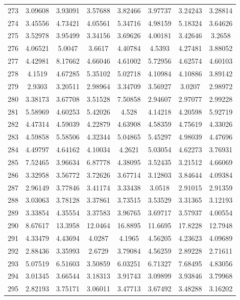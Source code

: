 \begin{figure}
\begin{tabular}{cccccccc}
273 & 3.09608 & 3.93091 & 3.57688 & 3.82466 & 3.97737 & 3.24243 & 3.28814\\
274 & 3.45556 & 4.73421 & 4.05561 & 5.34716 & 4.98159 & 5.18324 & 3.64626\\
275 & 3.52978 & 3.95499 & 3.34156 & 3.69626 & 4.00181 & 3.42646 & 3.2658\\
276 & 4.06521 & 5.0047 & 3.6617 & 4.40784 & 4.5393 & 4.27481 & 3.88052\\
277 & 4.42981 & 8.17662 & 4.66046 & 4.61002 & 5.72956 & 4.62574 & 4.60103\\
278 & 4.1519 & 4.67285 & 5.35102 & 5.02718 & 4.10984 & 4.10886 & 3.89142\\
279 & 2.9303 & 3.20511 & 2.98964 & 3.34709 & 3.56927 & 3.0207 & 2.98972\\
280 & 3.38173 & 3.67708 & 3.51528 & 7.50858 & 2.94607 & 2.97077 & 2.99228\\
281 & 5.58969 & 4.60253 & 5.42026 & 4.528 & 4.14218 & 4.20598 & 5.92719\\
282 & 4.47314 & 4.59039 & 4.22879 & 4.63908 & 4.58359 & 4.75619 & 4.33026\\
283 & 4.59858 & 5.58506 & 4.32344 & 5.04865 & 5.45297 & 4.98039 & 4.47696\\
284 & 4.49797 & 4.64162 & 4.10034 & 4.2621 & 5.03054 & 4.62273 & 3.76931\\
285 & 7.52465 & 3.96634 & 6.87778 & 4.38095 & 3.52435 & 3.21512 & 4.66069\\
286 & 3.32958 & 3.56772 & 3.72626 & 3.67714 & 3.12803 & 3.84644 & 4.09384\\
287 & 2.96149 & 3.77846 & 3.41174 & 3.33438 & 3.0518 & 2.91015 & 2.91359\\
288 & 3.03063 & 3.78128 & 3.37861 & 3.73515 & 3.53529 & 3.31365 & 3.12193\\
289 & 3.33854 & 4.35554 & 3.37583 & 3.96765 & 3.69717 & 3.57937 & 4.00554\\
290 & 8.67617 & 13.3958 & 12.0464 & 16.8895 & 11.6695 & 17.8228 & 12.7948\\
291 & 4.33479 & 4.43694 & 4.0287 & 4.1965 & 4.56205 & 4.23623 & 4.09689\\
292 & 2.88436 & 3.35993 & 2.6729 & 3.79084 & 4.56259 & 2.89228 & 2.71611\\
293 & 5.07519 & 6.51603 & 3.50859 & 6.03251 & 6.71327 & 7.68495 & 4.83056\\
294 & 3.01345 & 3.66544 & 3.18313 & 3.91743 & 3.09899 & 3.93846 & 3.79968\\
295 & 2.82193 & 3.75171 & 3.06011 & 3.47713 & 3.67492 & 3.48288 & 3.16202\\

\end{tabular}
\end{figure}
